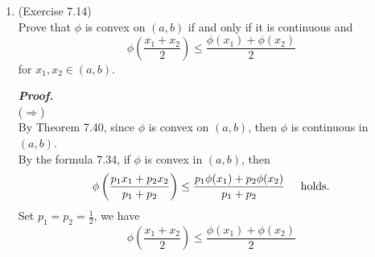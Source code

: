 \documentclass[a4paper,11pt]{article}
\begin{document}
\begin{enumerate}
 	\item (Exercise 7.14)\\
 		Prove that $\phi$ is convex on $(a,b)$ if and only if it is continuous and
 		$$\phi \left( \frac{x_1 + x_2}{2} \right) \leq \frac{\phi(x_1) + \phi(x_2)}{2}$$
 		for $x_1, x_2 \in (a,b)$.

 		\textit{\textbf {Proof.}}\\
 		($\Rightarrow$)\\
 		By Theorem 7.40, since $\phi$ is convex on $(a,b)$, then $\phi$ is continuous in $(a,b)$.\\
 		By the formula 7.34, if $\phi$ is convex in $(a,b)$, then
 		$$\phi \left( \frac{p_1 x_1 + p_2 x_2}{p_1 + p_2} \right)
 		\leq \frac{p_1 \phi(x_1) + p_2 \phi(x_2)}{p_1 + p_2} \hspace{0.5cm} \mbox{holds.}$$
 		Set $p_1 = p_2 = \frac{1}{2}$, we have
 		$$\phi \left( \frac{x_1 + x_2}{2} \right) \leq \frac{\phi(x_1) + \phi(x_2)}{2}$$\


\end{enumerate}
\end{document}
